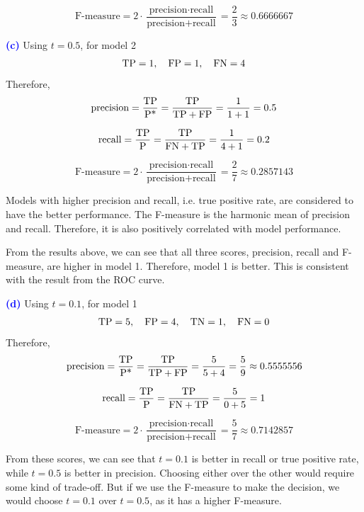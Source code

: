 \documentclass{article}
\newcommand{\qnum}[1]{\noindent\textcolor{blue}{\textbf{(#1)}}}
\newcommand{\tx}[1]{\text{#1}}
\begin{document}
\[
    \tx{F-measure} 
    = 2\cdot \frac{\tx{precision}\cdot \tx{recall}}{\tx{precision} + \tx{recall}}
    = \frac{2}{3}
    \approx 0.6666667
\]
\bigskip



\qnum{c}
Using $t=0.5$, for model 2
\[
    \TP = 1,\quad 
    \FP = 1,\quad 
    \FN = 4
\]
Therefore, 
\[
    \tx{precision} 
    = \frac{\TP}{\tx{P*}}
    =\frac{\TP}{\TP + \FP}
    = \frac{1}{1 + 1}
    = 0.5
\]

\[
    \tx{recall} 
    = \frac{\TP}{\tx{P}}
    =\frac{\TP}{\FN + \TP}
    = \frac{1}{4 + 1}
    = 0.2
\]

\[
    \tx{F-measure} 
    = 2\cdot \frac{\tx{precision}\cdot \tx{recall}}{\tx{precision} + \tx{recall}}
    = \frac{2}{7}
    \approx 0.2857143
\]


Models with higher precision and recall, i.e. true positive rate, are considered to have the better performance.
The F-measure is the harmonic mean of precision and recall. Therefore, it is also positively correlated with model performance.

From the results above, we can see that all three scores, precision, recall and F-measure, are higher in model 1. Therefore, model 1 is better. This is consistent with the result from the ROC curve.  
\bigskip











\qnum{d}
Using $t=0.1$, for model 1
\[
    \TP = 5,\quad 
    \FP = 4,\quad 
    \TN = 1,\quad 
    \FN = 0
\]
Therefore, 
\[
    \tx{precision} 
    = \frac{\TP}{\tx{P*}}
    =\frac{\TP}{\TP + \FP}
    = \frac{5}{5 + 4}
    = \frac{5}{9}
    \approx 0.5555556
\]

\[
    \tx{recall} 
    = \frac{\TP}{\tx{P}}
    =\frac{\TP}{\FN + \TP}
    = \frac{5}{0 + 5}
    = 1
\]

\[
    \tx{F-measure} 
    = 2\cdot \frac{\tx{precision}\cdot \tx{recall}}{\tx{precision} + \tx{recall}}
    = \frac{5}{7}
    \approx 0.7142857
\]

From these scores, we can see that $t=0.1$ is better in recall or true positive rate, while $t=0.5$ is better in precision. Choosing either over the other would require some kind of trade-off. But if we use the F-measure to make the decision, we would choose $t=0.1$ over $t=0.5$, as it has a higher F-measure.
\end{document}
